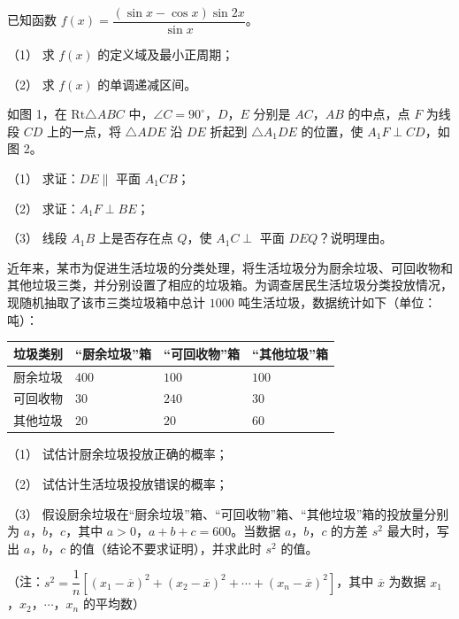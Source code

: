 \begin{question}
已知函数 $f(x)=\dfrac{(\sin x-\cos x)\sin2x}{\sin x}$。

（1） 求 $f(x)$ 的定义域及最小正周期；

（2） 求 $f(x)$ 的单调递减区间。

\Needspace{0.4\textheight}
\end{question}
\begin{question}
如图 1，在 $\mathrm{Rt}\triangle ABC$ 中，$\angle C=90^\circ$，$D$，$E$ 分别是 $AC$，$AB$ 的中点，点 $F$ 为线段 $CD$ 上的一点，将 $\triangle ADE$ 沿 $DE$ 折起到 $\triangle A_1DE$ 的位置，使 $A_1F\perp CD$，如图 2。

（1） 求证：$DE\parallel$ 平面 $A_1CB$；

（2） 求证：$A_1F\perp BE$；

（3） 线段 $A_1B$ 上是否存在点 $Q$，使 $A_1C\perp$ 平面 $DEQ$？说明理由。
\nopagebreak[4]
\begin{center}\end{center}
\nopagebreak[4]
\end{question}
\begin{question}
近年来，某市为促进生活垃圾的分类处理，将生活垃圾分为厨余垃圾、可回收物和其他垃圾三类，并分别设置了相应的垃圾箱。为调查居民生活垃圾分类投放情况，现随机抽取了该市三类垃圾箱中总计 $1000$ 吨生活垃圾，数据统计如下（单位：吨）：

\begin{center}
\begin{tabular}{llll}
\toprule
垃圾类别 & “厨余垃圾”箱 & “可回收物”箱 & “其他垃圾”箱 \\
\midrule
厨余垃圾 & $400$ & $100$ & $100$ \\
可回收物 & $30$ & $240$ & $30$ \\
其他垃圾 & $20$ & $20$ & $60$ \\
\bottomrule
\end{tabular}
\end{center}

（1） 试估计厨余垃圾投放正确的概率；

（2） 试估计生活垃圾投放错误的概率；

（3） 假设厨余垃圾在“厨余垃圾”箱、“可回收物”箱、“其他垃圾”箱的投放量分别为 $a$，$b$，$c$，其中 $a>0$，$a+b+c=600$。当数据 $a$，$b$，$c$ 的方差 $s^2$ 最大时，写出 $a$，$b$，$c$ 的值（结论不要求证明），并求此时 $s^2$ 的值。

（注：$s^2=\dfrac1n\left[(x_1-\overline x)^2+(x_2-\overline x)^2+\cdots+(x_n-\overline x)^2\right]$，其中 $\overline x$ 为数据 $x_1$，$x_2$，$\cdots$，$x_n$ 的平均数）

\end{question}
